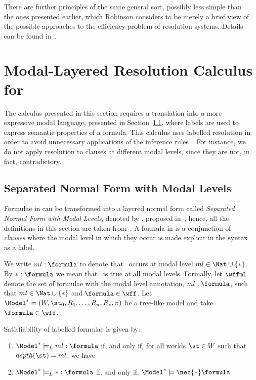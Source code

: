 There are further principles of the same general sort, possibly less simple than
the ones presented earlier, which Robinson considers to be merely a brief view
of the possible approaches to the efficiency problem of resolution systems.
Details can be found in~\cite{Robinson65}.

\section{Modal-Layered Resolution Calculus for }%
\label{sec:calculus}

The calculus presented in this section requires a translation into a more
expressive modal language, presented in Section~\ref{sec:snf}, where labels are
used to express semantic properties of a formula. This calculus uses 
labelled resolution in order to avoid unnecessary applications of the inference
rules~\cite{nalon2015modal}. For instance, we do not apply resolution to clauses
at different modal levels, since they are not, in fact, contradictory.

\subsection{Separated Normal Form with Modal Levels}%
\label{sec:snf}

Formulae in  can be transformed into a layered normal form called
\emph{Separated Normal Form with Modal Levels}, denoted by , proposed
in~\cite{journals/jal/NalonD07}, hence, all the definitions in this section are
taken from~\cite{journals/jal/NalonD07}. A formula in  is a
conjunction of \emph{clauses} where the modal level in which they occur is made
explicit in the syntax as a label.

We write $ml: \formula$ to denote that \formula~occurs at modal level $ml\in
\Nat \cup \{*\}$. By $*: \formula$ we mean that \formula~is true at
all modal levels. Formally, let $\wffml$ denote the set of formulae with
the modal level annotation, $ml : \formula$, such that $ml \in \Nat \cup \{*\}$
and $\formula \in \wff$. Let $\Model^* = (W, \st_0, R_1, \ldots, R_n, R_*, \pi)$
be a tree-like model and take $\formula \in \wff$. 

\begin{definition}
Satisfiability of labelled formulae is given by:

\begin{enumerate}
    \item $\Model^* \models_L ml : \formula$ if, and only if, for all worlds
        $\st \in W$ such that $depth(\st) = ml$, we have
        \sat{\Model^*}{\st}{\formula} 
    \item $\Model^* \models_L * : \formula$ if, and only if, $\Model^* \models
        \nec{*} \formula$
\end{enumerate}
    
\end{definition}

